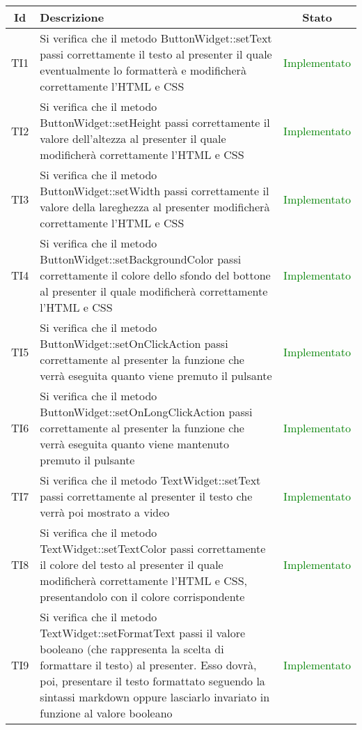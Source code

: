 \begin{center}
	\begin{longtable}{|c|>{\centering}m{10cm}|c|}\hline
		Id & Descrizione & Stato\\ \hline
		TI1 & Si verifica che il metodo ButtonWidget::setText passi correttamente il testo al presenter il quale eventualmente lo formatterà e modificherà correttamente l'HTML e CSS & \textcolor{Green}{Implementato}\\ \hline
		TI2 & Si verifica che il metodo ButtonWidget::setHeight passi correttamente il valore dell'altezza al presenter il quale modificherà correttamente l'HTML e CSS & \textcolor{Green}{Implementato}\\ \hline
		TI3 & Si verifica che il metodo ButtonWidget::setWidth passi correttamente il valore della lareghezza al presenter modificherà correttamente l'HTML e CSS & \textcolor{Green}{Implementato}\\ \hline
		TI4 & Si verifica che il metodo ButtonWidget::setBackgroundColor passi correttamente il colore dello sfondo del bottone al presenter il quale modificherà correttamente l'HTML e CSS & \textcolor{Green}{Implementato}\\ \hline
		TI5 & Si verifica che il metodo ButtonWidget::setOnClickAction passi correttamente al presenter la funzione che verrà eseguita quanto viene premuto il pulsante & \textcolor{Green}{Implementato}\\ \hline
		TI6 & Si verifica che il metodo ButtonWidget::setOnLongClickAction passi correttamente al presenter la funzione che verrà eseguita quanto viene mantenuto premuto il pulsante & \textcolor{Green}{Implementato}\\ \hline
		TI7 & Si verifica che il metodo TextWidget::setText passi correttamente al presenter il testo che verrà poi mostrato a video & \textcolor{Green}{Implementato}\\ \hline
		TI8 & Si verifica che il metodo TextWidget::setTextColor passi correttamente il colore del testo al presenter il quale modificherà correttamente l'HTML e CSS, presentandolo con il colore corrispondente & \textcolor{Green}{Implementato}\\ \hline
		TI9 & Si verifica che il metodo TextWidget::setFormatText passi il valore booleano (che rappresenta la scelta di formattare il testo) al presenter. Esso dovrà, poi, presentare il testo formattato seguendo la sintassi markdown oppure lasciarlo invariato in funzione al valore booleano & \textcolor{Green}{Implementato}\\ \hline

\end{longtable}
\end{center}
